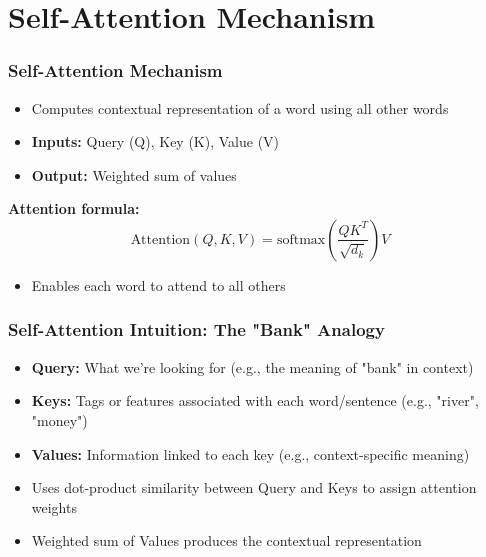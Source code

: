 \section{Self-Attention Mechanism}
\begin{frame}
\frametitle{Self-Attention Mechanism}
\begin{itemize}
    \item Computes contextual representation of a word using all other words
    \item \textbf{Inputs:} Query (Q), Key (K), Value (V)
    \item \textbf{Output:} Weighted sum of values
\end{itemize}

\textbf{Attention formula:}
\[
\text{Attention}(Q, K, V) = \mathrm{softmax}\left(\frac{QK^T}{\sqrt{d_k}}\right)V
\]

\begin{itemize}
    \item Enables each word to attend to all others
\end{itemize}
\end{frame}

\begin{frame}
\frametitle{Self-Attention Intuition: The "Bank" Analogy}
\begin{itemize}
    \item \textbf{Query:} What we’re looking for (e.g., the meaning of "bank" in context)
    \item \textbf{Keys:} Tags or features associated with each word/sentence (e.g., "river", "money")
    \item \textbf{Values:} Information linked to each key (e.g., context-specific meaning)
    \item Uses dot-product similarity between Query and Keys to assign attention weights
    \item Weighted sum of Values produces the contextual representation
\end{itemize}
\end{frame}

